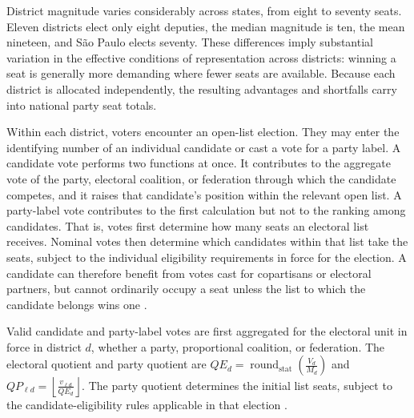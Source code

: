 \documentclass[11pt]{article}
\begin{document}
District magnitude varies considerably across states, from eight to seventy
seats. Eleven districts elect only eight deputies, the median magnitude is ten,
the mean nineteen, and S\~ao Paulo elects seventy. These differences imply
substantial variation in the effective conditions of representation across
districts: winning a seat is generally more demanding where fewer seats are
available. Because each district is allocated independently, the resulting
advantages and shortfalls carry into national party seat totals. 

Within each district, voters encounter an open-list election. They may enter the identifying number of an individual candidate or cast a vote for a party label. A candidate vote performs two functions at once. It contributes to the aggregate vote of the party, electoral coalition, or federation through which the candidate competes, and it raises that candidate's position within the relevant open list. A party-label vote contributes to the first calculation but not to the ranking among candidates. That is, votes first determine how many seats an electoral list receives. Nominal votes then determine which candidates within that list take the seats, subject to the individual eligibility requirements in force for the election. A candidate can therefore benefit from votes cast for copartisans or electoral partners, but cannot ordinarily occupy a seat unless the list to which the candidate belongs wins one \parencite{nicolau2006openlist}.

Valid candidate and party-label votes are first aggregated for the electoral
unit in force in district $d$, whether a party, proportional coalition, or
federation. The electoral quotient and party quotient are
\(QE_d=\operatorname{round}_{\mathrm{stat}}\!\left(\frac{V_d}{M_d}\right)\) and
\(QP_{\ell d}=\left\lfloor\frac{v_{\ell d}}{QE_d}\right\rfloor .\) The party
quotient determines the initial list seats, subject to the candidate-eligibility
rules applicable in that election
\parencite[arts.~106--108]{codigoEleitoral1965}.
\end{document}
